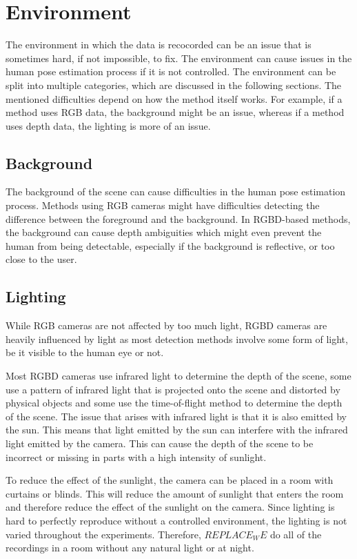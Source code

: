\section{Environment}

The environment in which the data is recocorded can be an issue that is sometimes hard, if not impossible, to fix. The environment can cause issues in the human pose estimation process if it is not controlled. The environment can be split into multiple categories, which are discussed in the following sections. The mentioned difficulties depend on how the method itself works. For example, if a method uses RGB data, the background might be an issue, whereas if a method uses depth data, the lighting is more of an issue.

\subsection{Background}

The background of the scene can cause difficulties in the human pose estimation process. Methods using RGB cameras might have difficulties detecting the difference between the foreground and the background. In RGBD-based methods, the background can cause depth ambiguities which might even prevent the human from being detectable, especially if the background is reflective, or too close to the user.

\subsection{Lighting}

While RGB cameras are not affected by too much light, RGBD cameras are heavily influenced by light as most detection methods involve some form of light, be it visible to the human eye or not.

Most RGBD cameras use infrared light to determine the depth of the scene, some use a pattern of infrared light that is projected onto the scene and distorted by physical objects and some use the time-of-flight method to determine the depth of the scene. The issue that arises with infrared light is that it is also emitted by the sun. This means that light emitted by the sun can interfere with the infrared light emitted by the camera. This can cause the depth of the scene to be incorrect or missing in parts with a high intensity of sunlight.

To reduce the effect of the sunlight, the camera can be placed in a room with curtains or blinds. This will reduce the amount of sunlight that enters the room and therefore reduce the effect of the sunlight on the camera. Since lighting is hard to perfectly reproduce without a controlled environment, the lighting is not varied throughout the experiments. Therefore, $REPLACE_WE$ do all of the recordings in a room without any natural light or at night.

